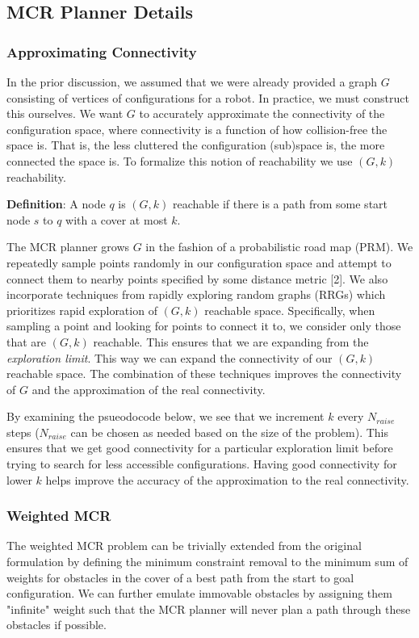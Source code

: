 \subsection{MCR Planner Details}
\subsubsection{Approximating Connectivity}
In the prior discussion, we assumed that we were already provided a graph $G$ consisting of vertices of configurations for a robot. In practice, we must construct this ourselves. We want $G$ to accurately approximate the connectivity of the configuration space, where connectivity is a function of how collision-free the space is. That is, the less cluttered the configuration (sub)space is, the more connected the space is. To formalize this notion of reachability we use $(G,k)$ reachability.

{\bf{Definition}}: A node $q$ is $(G,k)$ reachable if there is a path from some start node $s$ to $q$ with a cover at most $k$. 

The MCR planner grows $G$ in the fashion of a probabilistic road map (PRM). We repeatedly sample points randomly in our configuration space and attempt to connect them to nearby points specified by some distance metric [2]. We also incorporate techniques from rapidly exploring random graphs (RRGs) which prioritizes rapid exploration of $(G,k)$ reachable space. Specifically, when sampling a point and looking for points to connect it to, we consider only those that are $(G,k)$ reachable. This ensures that we are expanding from the \emph{exploration limit}. This way we can expand the connectivity of our $(G,k)$ reachable space. The combination of these techniques improves the connectivity of $G$ and the approximation of the real connectivity.  

By examining the psueodocode below, we see that we increment $k$ every $N_{raise}$ steps ($N_{raise}$ can be chosen as needed based on the size of the problem). This ensures that we get good connectivity for a particular exploration limit before trying to search for less accessible configurations. Having good connectivity for lower $k$ helps improve the accuracy of the approximation to the real connectivity. 

\subsubsection{Weighted MCR}
The weighted MCR problem can be trivially extended from the original formulation by defining the minimum constraint removal to the minimum sum of weights for obstacles in the cover of a best path from the start to goal configuration. We can further emulate immovable obstacles by assigning them "infinite" weight such that the MCR planner will never plan a path through these obstacles if possible. 

